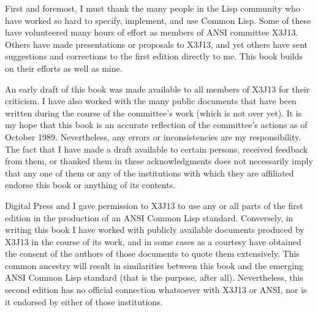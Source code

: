First and foremost, I must thank the many people in the Lisp
community who have worked so hard to specify, implement, and use
Common Lisp.  Some of these have volunteered many hours
of effort as members of ANSI committee X3J13.  Others
have made presentations or proposals to X3J13, and yet others
have sent suggestions and corrections to the first edition directly to me.
This book builds on their efforts as well as mine.


An early draft of this book was made available to all members
of X3J13 for their criticism.  I have also worked with
the many public documents that have been written during the course
of the committee's work (which is not over yet).
It is my hope that this book is an accurate reflection of the
committee's actions as of October 1989.
Nevertheless, any errors or inconsistencies are my responsibility.
The fact that I have made a draft available to certain persons,
received feedback from them, or thanked them in these
acknowledgments does not necessarily imply that any one of them
or any of the institutions with which they are affiliated endorse this book
or anything of its contents.

Digital Press and I gave permission to X3J13 to use any or all parts
of the first edition in the production of an ANSI Common Lisp standard.
Conversely, in writing this book I have worked with publicly available
documents produced by X3J13 in the course of its work, and in some cases
as a courtesy have obtained the consent of the authors of those documents
to quote them extensively.  This common ancestry will result in similarities
between this book and the emerging ANSI Common Lisp standard (that is the
purpose, after all).  Nevertheless, this second edition 
has no official connection whatsoever
with X3J13 or ANSI, nor is it endorsed by either of those institutions.

